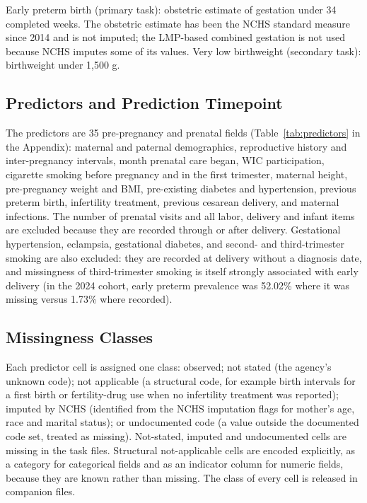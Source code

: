 \documentclass[journal]{IEEEtran}
\begin{document}
Early preterm birth (primary task): obstetric estimate of gestation under 34 completed weeks. The obstetric estimate has been the NCHS standard measure since 2014 and is not imputed; the LMP-based combined gestation is not used because NCHS imputes some of its values. Very low birthweight (secondary task): birthweight under 1,500 g.

\subsection{Predictors and Prediction Timepoint}

The predictors are 35 pre-pregnancy and prenatal fields (Table~\ref{tab:predictors} in the Appendix): maternal and paternal demographics, reproductive history and inter-pregnancy intervals, month prenatal care began, WIC participation, cigarette smoking before pregnancy and in the first trimester, maternal height, pre-pregnancy weight and BMI, pre-existing diabetes and hypertension, previous preterm birth, infertility treatment, previous cesarean delivery, and maternal infections. The number of prenatal visits and all labor, delivery and infant items are excluded because they are recorded through or after delivery. Gestational hypertension, eclampsia, gestational diabetes, and second- and third-trimester smoking are also excluded: they are recorded at delivery without a diagnosis date, and missingness of third-trimester smoking is itself strongly associated with early delivery (in the 2024 cohort, early preterm prevalence was 52.02\% where it was missing versus 1.73\% where recorded).

\subsection{Missingness Classes}

Each predictor cell is assigned one class: observed; not stated (the agency's unknown code); not applicable (a structural code, for example birth intervals for a first birth or fertility-drug use when no infertility treatment was reported); imputed by NCHS (identified from the NCHS imputation flags for mother's age, race and marital status); or undocumented code (a value outside the documented code set, treated as missing). Not-stated, imputed and undocumented cells are missing in the task files. Structural not-applicable cells are encoded explicitly, as a category for categorical fields and as an indicator column for numeric fields, because they are known rather than missing. The class of every cell is released in companion files.
\end{document}
